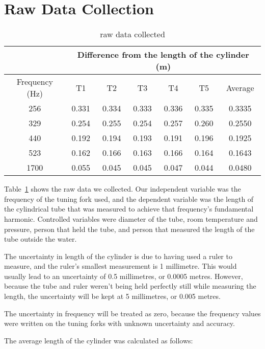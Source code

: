 \documentclass{article}
\begin{document}
\section{Raw Data Collection}

\begin{table}[H]
  \centering
  \begin{tabular}{@{}ccccccc@{}}
    \toprule
    & \multicolumn{6}{c}{Difference from the length of the cylinder
    (m)} \\
    \midrule
    Frequency (Hz) & T1    & T2    & T3    & T4    & T5    & Average \\
    256            & 0.331 & 0.334 & 0.333 & 0.336 & 0.335 & 0.3335  \\
    329            & 0.254 & 0.255 & 0.254 & 0.257 & 0.260 & 0.2550  \\
    440            & 0.192 & 0.194 & 0.193 & 0.191 & 0.196 & 0.1925  \\
    523            & 0.162 & 0.166 & 0.163 & 0.166 & 0.164 & 0.1643  \\
    1700           & 0.055 & 0.045 & 0.045 & 0.047 & 0.044 & 0.0480  \\
    \bottomrule
  \end{tabular}
  \caption{raw data collected}\label{tab:raw-data}
\end{table}

Table~\ref{tab:raw-data} shows the raw data we collected. Our
independent variable was
the frequency of the tuning fork used, and the dependent variable was
the length of the cylindrical tube that was measured to achieve that
frequency's fundamental harmonic. Controlled variables were diameter
of the tube, room temperature and pressure, person that held the
tube, and person that measured the length of the tube outside the water.

The uncertainty in length of the cylinder is due to having used a
ruler to measure, and the ruler's smallest measurement is 1
millimetre. This would usually lead to an uncertainty of 0.5
millimetres, or 0.0005 metres. However, because the tube and ruler
weren't being held perfectly still while measuring the length, the
uncertainty will be kept at 5 millimetres, or 0.005 metres.

The uncertainty in frequency will be treated as zero, because the
frequency values were written on the tuning forks with unknown
uncertainty and accuracy.

The average length of the cylinder was calculated as follows:
\end{document}
